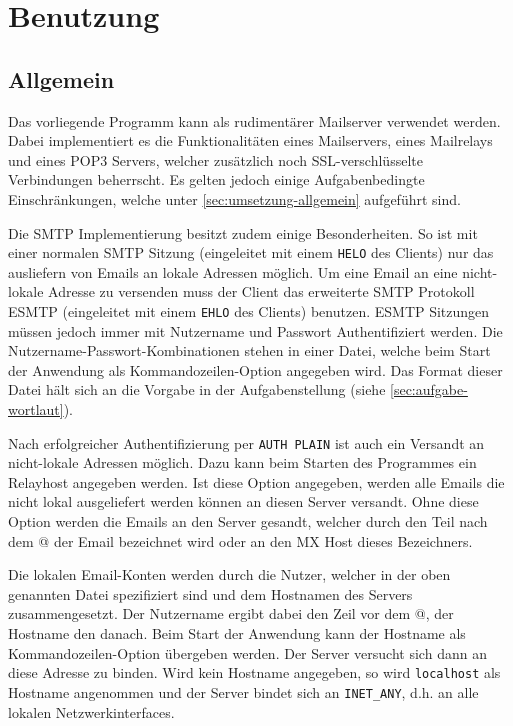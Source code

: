 \documentclass[final,a4paper,11pt,notitlepage,halfparskip]{scrreprt}
\begin{document}
\chapter{Benutzung}

\section{Allgemein}
Das vorliegende Programm kann als rudimentärer Mailserver verwendet werden.
Dabei implementiert es die Funktionalitäten eines Mailservers, eines Mailrelays
und eines POP3 Servers, welcher zusätzlich noch SSL-verschlüsselte Verbindungen
beherrscht. Es gelten jedoch einige Aufgabenbedingte Einschränkungen, welche
unter \ref{sec:umsetzung-allgemein} aufgeführt sind.

Die SMTP Implementierung besitzt zudem einige Besonderheiten. So ist mit einer
normalen SMTP Sitzung (eingeleitet mit einem \texttt{HELO} des Clients) nur das
ausliefern von Emails an lokale Adressen möglich. Um eine Email an eine
nicht-lokale Adresse zu versenden muss der Client das erweiterte SMTP Protokoll
ESMTP (eingeleitet mit einem \texttt{EHLO} des Clients) benutzen. ESMTP
Sitzungen müssen jedoch immer mit Nutzername und Passwort Authentifiziert
werden. Die Nutzername-Passwort-Kombinationen stehen in einer Datei, welche beim
Start der Anwendung als Kommandozeilen-Option angegeben wird. Das Format dieser
Datei hält sich an die Vorgabe in der Aufgabenstellung (siehe
\ref{sec:aufgabe-wortlaut}). 

Nach erfolgreicher Authentifizierung per \texttt{AUTH PLAIN} ist auch ein
Versandt an nicht-lokale Adressen möglich. Dazu kann beim Starten des Programmes
ein Relayhost angegeben werden. Ist diese Option angegeben, werden alle Emails
die nicht lokal ausgeliefert werden können an diesen Server versandt. Ohne diese
Option werden die Emails an den Server gesandt, welcher durch den Teil nach dem
@ der Email bezeichnet wird oder an den MX Host dieses Bezeichners.

Die lokalen Email-Konten werden durch die Nutzer, welcher in der oben genannten
Datei spezifiziert sind und dem Hostnamen des Servers zusammengesetzt. Der
Nutzername ergibt dabei den Zeil vor dem @, der Hostname den danach. Beim Start
der Anwendung kann der Hostname als Kommandozeilen-Option übergeben werden. Der
Server versucht sich dann an diese Adresse zu binden. Wird kein Hostname
angegeben, so wird \texttt{localhost} als Hostname angenommen und der Server
bindet sich an \texttt{INET\_ANY}, d.h. an alle lokalen Netzwerkinterfaces.
\end{document}
